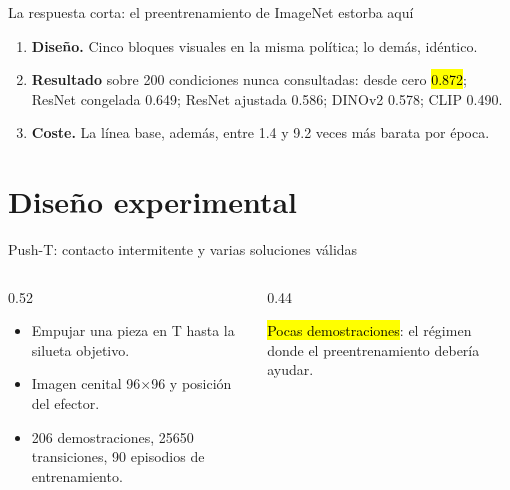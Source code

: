 \documentclass[aspectratio=169,11pt]{beamer}
\begin{document}
\begin{frame}{La respuesta corta: el preentrenamiento de ImageNet estorba aquí}
  \begin{enumerate}
    \item \textbf{Diseño.} Cinco bloques visuales en la misma política; lo demás, idéntico.
    \item \textbf{Resultado} sobre \num{200} condiciones nunca consultadas: desde cero
          \hl{\num{0.872}}; ResNet congelada \num{0.649}; ResNet ajustada \num{0.586};
          DINOv2 \num{0.578}; CLIP \num{0.490}.
    \item \textbf{Coste.} La línea base, además, entre \num{1.4} y \num{9.2} veces más
          barata por época.
  \end{enumerate}
\end{frame}

\section{Diseño experimental}

\begin{frame}{Push-T: contacto intermitente y varias soluciones válidas}
  \begin{columns}[T,onlytextwidth]
    \begin{column}{0.52\textwidth}
      \begin{itemize}
        \item Empujar una pieza en T hasta la silueta objetivo.
        \item Imagen cenital \num{96}$\times$\num{96} y posición del efector.
        \item \num{206} demostraciones, \num{25650} transiciones, \num{90} episodios de
              entrenamiento.
      \end{itemize}
    \end{column}
    \begin{column}{0.44\textwidth}
      \begin{keypoint}
        \hl{Pocas demostraciones}: el régimen donde el preentrenamiento debería ayudar.
      \end{keypoint}
    \end{column}
  \end{columns}
\end{frame}
\end{document}
